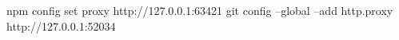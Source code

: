 npm config set proxy http://127.0.0.1:63421
git config --global --add http.proxy http://127.0.0.1:52034